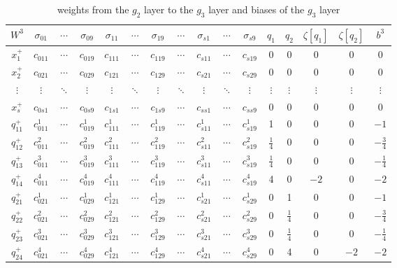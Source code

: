 \begin{table}[p]
	\centering
	\begin{tabular}{|c| c c c c c c c c c c c c c c |c|}
		\hline 
		$W^3$ & $\sigma_{01}$ & $\cdots$ & $\sigma_{09}$ & $\sigma_{11}$ & $\cdots$ & $\sigma_{19}$ & $\cdots$ & $\sigma_{s1}$ & $\cdots$ & $\sigma_{s9}$ & $q_1$ & $q_2$ & $\zeta[q_1]$ & $\zeta[q_2]$ & $b^3$ \\
		\hline
		$x_1^+$ & $c_{011}$ & $\cdots$ & $c_{019}$ & $c_{111}$ & $\cdots$ & $c_{119}$ & $\cdots$ & $c_{s11}$ & $\cdots$ & $c_{s19}$ & 0 & 0 & 0 & 0 & 0 \\
		$x_2^+$ & $c_{021}$ & $\cdots$ & $c_{029}$ & $c_{121}$ & $\cdots$ & $c_{129}$ & $\cdots$ & $c_{s21}$ & $\cdots$ & $c_{s29}$ & 0 & 0 & 0 & 0 & 0 \\
		$\vdots$ & $\vdots$ & $\ddots$ & $\vdots$ & $\vdots$ & $\ddots$ & $\vdots$ & $\ddots$ & $\vdots$ & $\ddots$ & $\vdots$ & $\vdots$ & $\vdots$ & $\vdots$ & $\vdots$ & $\vdots$ \\
		$x_s^+$ & $c_{0s1}$ & $\cdots$ & $c_{0s9}$ & $c_{1s1}$ & $\cdots$ & $c_{1s9}$ & $\cdots$ & $c_{ss1}$ & $\cdots$ & $c_{ss9}$ & 0 & 0 & 0 & 0 & 0 \\
				
		$q_{11}^+$ & $c_{011}^1$ & $\cdots$ & $c_{019}^1$ & $c_{111}^1$ & $\cdots$ & $c_{119}^1$ & $\cdots$ & $c_{s11}^1$ & $\cdots$ & $c_{s19}^1$ & 1 & 0 & 0 & 0 & $-1$ \\
		$q_{12}^+$ & $c_{011}^2$ & $\cdots$ & $c_{019}^2$ & $c_{111}^2$ & $\cdots$ & $c_{119}^2$ & $\cdots$ & $c_{s11}^2$ & $\cdots$ & $c_{s19}^2$ & $\frac{1}{4}$ & 0 & 0 & 0 & $-\frac{3}{4}$ \\
		$q_{13}^+$ & $c_{011}^3$ & $\cdots$ & $c_{019}^3$ & $c_{111}^3$ & $\cdots$ & $c_{119}^3$ & $\cdots$ & $c_{s11}^3$ & $\cdots$ & $c_{s19}^3$ & $\frac{1}{4}$ & 0 & 0 & 0 & $-\frac{1}{4}$ \\
		$q_{14}^+$ & $c_{011}^4$ & $\cdots$ & $c_{019}^4$ & $c_{111}^4$ & $\cdots$ & $c_{119}^4$ & $\cdots$ & $c_{s11}^4$ & $\cdots$ & $c_{s19}^4$ & 4 & 0 & $-2$ & 0 & $-2$ \\
				
		$q_{21}^+$ & $c_{021}^1$ & $\cdots$ & $c_{029}^1$ & $c_{121}^1$ & $\cdots$ & $c_{129}^1$ & $\cdots$ & $c_{s21}^1$ & $\cdots$ & $c_{s29}^1$ & 0 & 1 & 0 & 0 & $-1$ \\
		$q_{22}^+$ & $c_{021}^2$ & $\cdots$ & $c_{029}^2$ & $c_{121}^2$ & $\cdots$ & $c_{129}^2$ & $\cdots$ & $c_{s21}^2$ & $\cdots$ & $c_{s29}^2$ & 0 & $\frac{1}{4}$ & 0 & 0 & $-\frac{3}{4}$ \\
		$q_{23}^+$ & $c_{021}^3$ & $\cdots$ & $c_{029}^3$ & $c_{121}^3$ & $\cdots$ & $c_{129}^3$ & $\cdots$ & $c_{s21}^3$ & $\cdots$ & $c_{s29}^3$ & 0 & $\frac{1}{4}$ & 0 & 0 & $-\frac{1}{4}$ \\
		$q_{24}^+$ & $c_{021}^4$ & $\cdots$ & $c_{029}^4$ & $c_{121}^4$ & $\cdots$ & $c_{129}^4$ & $\cdots$ & $c_{s21}^4$ & $\cdots$ & $c_{s29}^4$ & 0 & 4 & 0 & $-2$ & $-2$ \\
		\hline
	\end{tabular}
	\caption{weights from the $g_2$ layer to the $g_3$ layer and biases of the $g_3$ layer}
	\label{tab:W3b3}
\end{table}